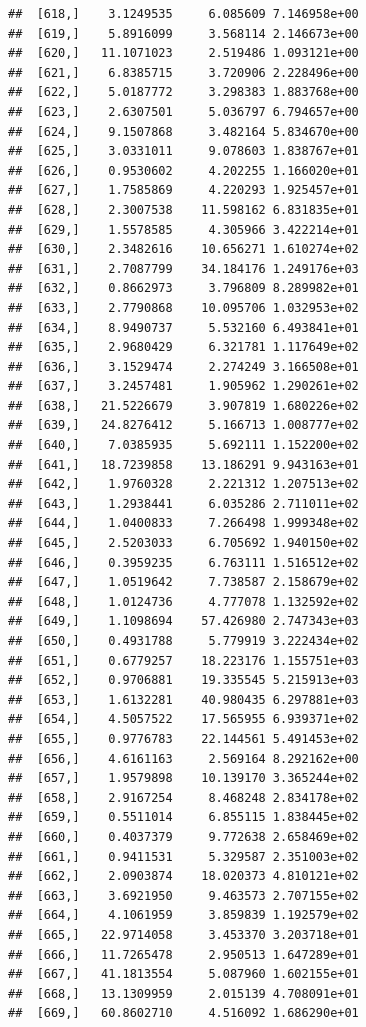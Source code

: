 \documentclass[article]{jss}\usepackage[]{graphicx}\usepackage[]{xcolor}
\makeatletter
\newenvironment{kframe}{%
 \def\at@end@of@kframe{}%
 \ifinner\ifhmode%
  \def\at@end@of@kframe{\end{minipage}}%
  \begin{minipage}{\columnwidth}%
 \fi\fi%
 \def\FrameCommand##1{\hskip\@totalleftmargin \hskip-\fboxsep
 \colorbox{shadecolor}{##1}\hskip-\fboxsep
     \hskip-\linewidth \hskip-\@totalleftmargin \hskip\columnwidth}%
 \MakeFramed {\advance\hsize-\width
   \@totalleftmargin\z@ \linewidth\hsize
   \@setminipage}}%
 {\par\unskip\endMakeFramed%
 \at@end@of@kframe}
\newenvironment{knitrout}{}{} %
\makeatother
\begin{document}
\begin{knitrout}
\begin{kframe}
\begin{verbatim}
##  [618,]    3.1249535     6.085609 7.146958e+00
##  [619,]    5.8916099     3.568114 2.146673e+00
##  [620,]   11.1071023     2.519486 1.093121e+00
##  [621,]    6.8385715     3.720906 2.228496e+00
##  [622,]    5.0187772     3.298383 1.883768e+00
##  [623,]    2.6307501     5.036797 6.794657e+00
##  [624,]    9.1507868     3.482164 5.834670e+00
##  [625,]    3.0331011     9.078603 1.838767e+01
##  [626,]    0.9530602     4.202255 1.166020e+01
##  [627,]    1.7585869     4.220293 1.925457e+01
##  [628,]    2.3007538    11.598162 6.831835e+01
##  [629,]    1.5578585     4.305966 3.422214e+01
##  [630,]    2.3482616    10.656271 1.610274e+02
##  [631,]    2.7087799    34.184176 1.249176e+03
##  [632,]    0.8662973     3.796809 8.289982e+01
##  [633,]    2.7790868    10.095706 1.032953e+02
##  [634,]    8.9490737     5.532160 6.493841e+01
##  [635,]    2.9680429     6.321781 1.117649e+02
##  [636,]    3.1529474     2.274249 3.166508e+01
##  [637,]    3.2457481     1.905962 1.290261e+02
##  [638,]   21.5226679     3.907819 1.680226e+02
##  [639,]   24.8276412     5.166713 1.008777e+02
##  [640,]    7.0385935     5.692111 1.152200e+02
##  [641,]   18.7239858    13.186291 9.943163e+01
##  [642,]    1.9760328     2.221312 1.207513e+02
##  [643,]    1.2938441     6.035286 2.711011e+02
##  [644,]    1.0400833     7.266498 1.999348e+02
##  [645,]    2.5203033     6.705692 1.940150e+02
##  [646,]    0.3959235     6.763111 1.516512e+02
##  [647,]    1.0519642     7.738587 2.158679e+02
##  [648,]    1.0124736     4.777078 1.132592e+02
##  [649,]    1.1098694    57.426980 2.747343e+03
##  [650,]    0.4931788     5.779919 3.222434e+02
##  [651,]    0.6779257    18.223176 1.155751e+03
##  [652,]    0.9706881    19.335545 5.215913e+03
##  [653,]    1.6132281    40.980435 6.297881e+03
##  [654,]    4.5057522    17.565955 6.939371e+02
##  [655,]    0.9776783    22.144561 5.491453e+02
##  [656,]    4.6161163     2.569164 8.292162e+00
##  [657,]    1.9579898    10.139170 3.365244e+02
##  [658,]    2.9167254     8.468248 2.834178e+02
##  [659,]    0.5511014     6.855115 1.838445e+02
##  [660,]    0.4037379     9.772638 2.658469e+02
##  [661,]    0.9411531     5.329587 2.351003e+02
##  [662,]    2.0903874    18.020373 4.810121e+02
##  [663,]    3.6921950     9.463573 2.707155e+02
##  [664,]    4.1061959     3.859839 1.192579e+02
##  [665,]   22.9714058     3.453370 3.203718e+01
##  [666,]   11.7265478     2.950513 1.647289e+01
##  [667,]   41.1813554     5.087960 1.602155e+01
##  [668,]   13.1309959     2.015139 4.708091e+01
##  [669,]   60.8602710     4.516092 1.686290e+01

\end{verbatim}
\end{kframe}
\end{knitrout}
\end{document}
